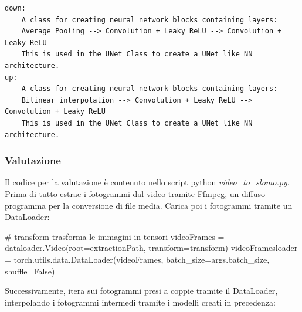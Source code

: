 \begin{verbatim}
down:
    A class for creating neural network blocks containing layers:
    Average Pooling --> Convolution + Leaky ReLU --> Convolution + Leaky ReLU
    This is used in the UNet Class to create a UNet like NN architecture.
up:
    A class for creating neural network blocks containing layers: 
    Bilinear interpolation --> Convolution + Leaky ReLU --> Convolution + Leaky ReLU
    This is used in the UNet Class to create a UNet like NN architecture.
\end{verbatim}

\subsubsection*{Valutazione}

Il codice per la valutazione è contenuto nello script python \emph{video\_to\_slomo.py}.
Prima di tutto estrae i fotogrammi dal video tramite Ffmpeg, un diffuso programma per la 
conversione di file media. Carica poi i fotogrammi tramite un DataLoader:

\begin{Python}
# transform trasforma le immagini in tensori
videoFrames = dataloader.Video(root=extractionPath, transform=transform)
videoFramesloader = torch.utils.data.DataLoader(videoFrames, batch_size=args.batch_size, shuffle=False)
\end{Python}

Successivamente, itera sui fotogrammi presi a coppie tramite il DataLoader, interpolando i 
fotogrammi intermedi tramite i modelli creati in precedenza:

